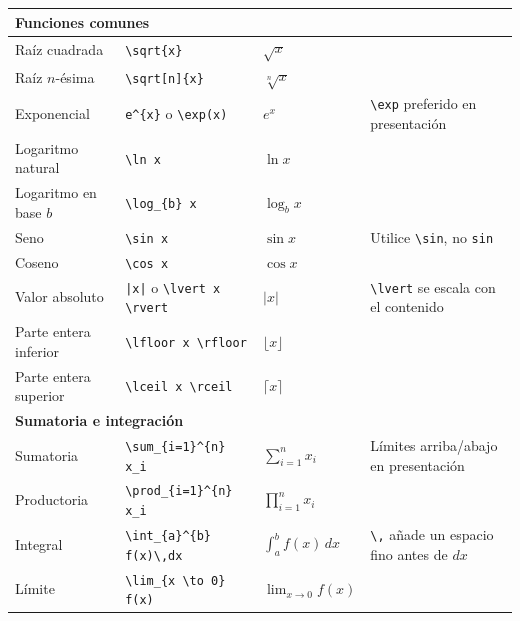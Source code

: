 \begin{longtable}{p{3.2cm} p{4.5cm} p{3.0cm} p{3.5cm}}
\multicolumn{4}{l}{\textbf{Funciones comunes}} \\
\midrule
Raíz cuadrada & \verb|\sqrt{x}| & $\sqrt{x}$ & \\
Raíz $n$-ésima & \verb|\sqrt[n]{x}| & $\sqrt[n]{x}$ & \\
Exponencial & \verb|e^{x}| o \verb|\exp(x)| & $e^{x}$ & \verb|\exp| preferido en presentación \\
Logaritmo natural & \verb|\ln x| & $\ln x$ & \\
Logaritmo en base $b$ & \verb|\log_{b} x| & $\log_{b} x$ & \\
Seno & \verb|\sin x| & $\sin x$ & Utilice \verb|\sin|, no \texttt{sin} \\
Coseno & \verb|\cos x| & $\cos x$ & \\
Valor absoluto & \verb+|x|+ o \verb|\lvert x \rvert| & $\lvert x \rvert$ & \verb|\lvert| se escala con el contenido \\
Parte entera inferior & \verb|\lfloor x \rfloor| & $\lfloor x \rfloor$ & \\
Parte entera superior & \verb|\lceil x \rceil| & $\lceil x \rceil$ & \\
\midrule

\multicolumn{4}{l}{\textbf{Sumatoria e integración}} \\
\midrule
Sumatoria & \verb|\sum_{i=1}^{n} x_i| & $\sum_{i=1}^{n} x_i$ & Límites arriba/abajo en presentación \\
Productoria & \verb|\prod_{i=1}^{n} x_i| & $\prod_{i=1}^{n} x_i$ & \\
Integral & \verb|\int_{a}^{b} f(x)\,dx| & $\int_{a}^{b} f(x)\,dx$ & \verb|\,| añade un espacio fino antes de $dx$ \\
Límite & \verb|\lim_{x \to 0} f(x)| & $\lim_{x \to 0} f(x)$ & \\
\midrule


\end{longtable}
